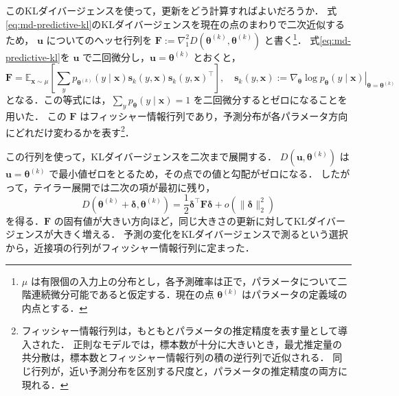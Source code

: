 \documentclass[../main.tex]{subfiles}
\begin{document}
このKLダイバージェンスを使って，更新をどう計算すればよいだろうか．
式\eqref{eq:md-predictive-kl}のKLダイバージェンスを現在の点のまわりで二次近似するため，
$\bm{u}$ についてのヘッセ行列を $\bm{F}:=\nabla_1^2D(\bm{\theta}^{(k)},\bm{\theta}^{(k)})$ と書く\footnote{$\mu$ は有限個の入力上の分布とし，各予測確率は正で，パラメータについて二階連続微分可能であると仮定する．現在の点 $\bm{\theta}^{(k)}$ はパラメータの定義域の内点とする．}．
式\eqref{eq:md-predictive-kl}を $\bm{u}$ で二回微分し，$\bm{u}=\bm{\theta}^{(k)}$ とおくと，
\begin{equation}
  \bm{F}=\mathbb{E}_{\bm{x}\sim\mu}
  \left[\sum_y p_{\bm{\theta}^{(k)}}(y\mid\bm{x})
  \bm{s}_k(y,\bm{x})\bm{s}_k(y,\bm{x})^\top\right],
  \quad
  \bm{s}_k(y,\bm{x})
  :=\left.\nabla_{\bm{\theta}}\log p_{\bm{\theta}}(y\mid\bm{x})
  \right|_{\bm{\theta}=\bm{\theta}^{(k)}}
  \label{eq:md-kl-fisher}
\end{equation}
となる．この等式には，$\sum_y p_{\bm{\theta}}(y\mid\bm{x})=1$ を二回微分するとゼロになることを用いた．
この $\bm{F}$ はフィッシャー情報行列であり，予測分布が各パラメータ方向にどれだけ変わるかを表す\footnote{フィッシャー情報行列は，もともとパラメータの推定精度を表す量として導入された．
正則なモデルでは，標本数が十分に大きいとき，最尤推定量の共分散は，標本数とフィッシャー情報行列の積の逆行列で近似される．
同じ行列が，近い予測分布を区別する尺度と，パラメータの推定精度の両方に現れる\cite{akaike1980entropy}．}．

この行列を使って，KLダイバージェンスを二次まで展開する．
$D(\bm{u},\bm{\theta}^{(k)})$ は $\bm{u}=\bm{\theta}^{(k)}$ で最小値ゼロをとるため，その点での値と勾配がゼロになる．
したがって，テイラー展開では二次の項が最初に残り，
\begin{equation}
  D(\bm{\theta}^{(k)}+\bm{\delta},\bm{\theta}^{(k)})
  =\frac12\bm{\delta}^\top\bm{F}\bm{\delta}
  +o(\|\bm{\delta}\|_2^2)
  \label{eq:md-kl-local}
\end{equation}
を得る．$\bm{F}$ の固有値が大きい方向ほど，同じ大きさの更新に対してKLダイバージェンスが大きく増える．
予測の変化をKLダイバージェンスで測るという選択から，近接項の行列がフィッシャー情報行列に定まった．
\end{document}
